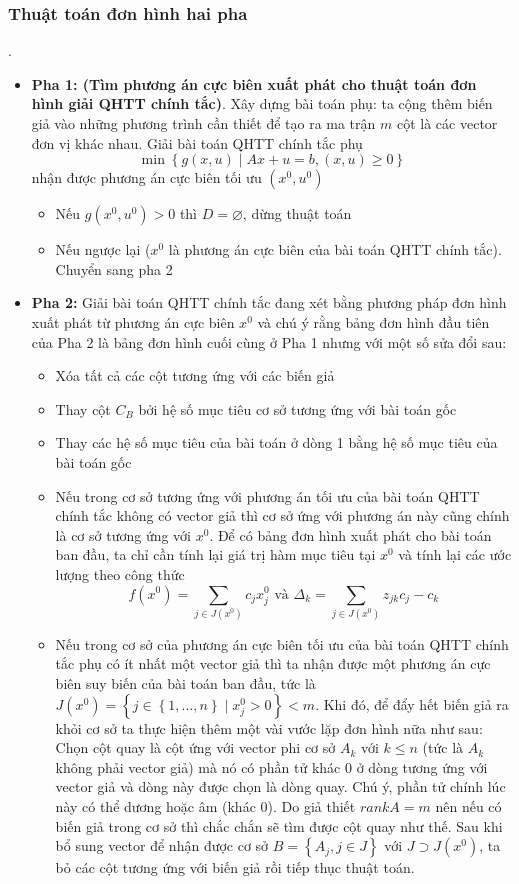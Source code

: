 \documentclass[12pt,a4paper]{article}\author{Nguyễn Nho Dũng}
\newcommand{\taphop}[1]{\left\{#1\right\}}
\newcommand{\ngoacto}[1]{\left(#1\right)}
\newcommand{\tongchisocoso}{\sum_{j\in J(x^0)}}
\begin{document}
\subsubsection{Thuật toán đơn hình hai pha}
\begin{thuattoan}.
	\begin{itemize}
		\item \textbf{Pha 1: (Tìm phương án cực biên xuất phát cho thuật toán đơn hình giải QHTT chính tắc)}. Xây dựng bài toán phụ: ta cộng thêm biến giả vào những phương trình cần thiết để tạo ra ma trận $m$ cột là các vector đơn vị khác nhau. Giải bài toán QHTT chính tắc phụ \begin{equation}
			\min\taphop{g(x, u) \mid Ax + u = b, \ngoacto{x, u} \ge 0}
		\end{equation} nhận được phương án cực biên tối ưu $\ngoacto{x^0, u^0}$
		\begin{itemize}
			\item Nếu $g(x^0, u^0) > 0$ thì $D = \varnothing$, dừng thuật toán
			\item Nếu ngược lại ($x^0$ là phương án cực biên của bài toán QHTT chính tắc). Chuyển sang pha 2
		\end{itemize}
		\item \textbf{Pha 2:} Giải bài toán QHTT chính tắc đang xét bằng phương pháp đơn hình xuất phát từ phương án cực biên $x^0$ và chú ý rằng bảng đơn hình đầu tiên của Pha 2 là bảng đơn hình cuối cùng ở Pha 1 nhưng với một số sửa đổi sau:
		\begin{itemize}
			\item Xóa tất cả các cột tương ứng với các biến giả
			\item Thay cột $C_B$ bởi hệ số mục tiêu cơ sở tương ứng với bài toán gốc
			\item Thay các hệ số mục tiêu của bài toán ở dòng 1 bằng hệ số mục tiêu của bài toán gốc
			\item Nếu trong cơ sở tương ứng với phương án tối ưu của bài toán QHTT chính tắc không có vector giả thì cơ sở ứng với phương án này cũng chính là cơ sở tương ứng với $x^0$. Để có bảng đơn hình xuất phát cho bài toán ban đầu, ta chỉ cần tính lại giá trị hàm mục tiêu tại $x^0$ và tính lại các ước lượng theo công thức $$f(x^0) = \tongchisocoso c_jx_j^0 \text{ và } \Delta_k = \tongchisocoso z_{jk}c_j - c_k$$
			\item Nếu trong cơ sở của phương án cực biên tối ưu của bài toán QHTT chính tắc phụ có ít nhất một vector giả thì ta nhận được một phương án cực biên suy biến của bài toán ban đầu, tức là $J(x^0) = \taphop{j\in\taphop{1,\ldots,n} \mid x_j^0 > 0} < m$. Khi đó, để đẩy hết biến giả ra khỏi cơ sở ta thực hiện thêm một vài vước lặp đơn hình nữa như sau: Chọn cột quay là cột ứng với vector phi cơ sở $A_k$ với $k\le n$ (tức là $A_k$ không phải vector giả) mà nó có phần tử khác $0$ ở dòng tương ứng với vector giả và dòng này được chọn là dòng quay. Chú ý, phần tử chính lúc này có thể dương hoặc âm (khác $0$). Do giả thiết $rank A = m$ nên nếu có biến giả trong cơ sở thì chắc chắn sẽ tìm được cột quay như thế. Sau khi bổ sung vector để nhận được cơ sở $B = \taphop{A_j, j\in J}$ với $J \supset J(x^0)$, ta bỏ các cột tương ứng với biến giả rồi tiếp thục thuật toán.

\end{itemize}
\end{itemize}
\end{thuattoan}
\end{document}

